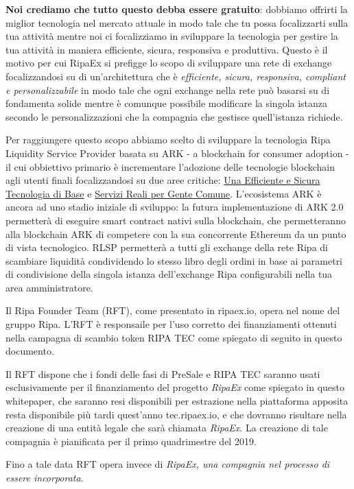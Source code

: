 \textbf{Noi crediamo che tutto questo debba essere gratuito}: dobbiamo offrirti la miglior tecnologia nel mercato attuale in modo tale che tu 
possa focalizzarti sulla tua attività mentre noi ci focalizziamo in sviluppare la tecnologia per gestire la tua attività in maniera efficiente, 
sicura, responsiva e produttiva. Questo è il motivo per cui RipaEx si prefigge lo scopo di sviluppare una rete di exchange
focalizzandosi su di un'architettura che è \textit{efficiente, sicura, responsiva, compliant e personalizzabile} in modo tale che ogni exchange
nella rete può basarsi su di fondamenta solide mentre è comunque possibile modificare la singola istanza secondo le personalizzazioni 
che la compagnia che gestisce quell'istanza richiede.

Per raggiungere questo scopo abbiamo scelto di sviluppare la tecnologia Ripa Liquidity Service Provider basata su ARK - a blockchain for consumer adoption - 
il cui obbiettivo primario è incrementare l'adozione delle tecnologie blockchain agli utenti finali focalizzandosi su due aree critiche: 
\underline{Una Efficiente e Sicura Tecnologia di Base} e \underline{Servizi Reali per Gente Comune}. L'ecosistema ARK è ancora ad uno stadio
iniziale di sviluppo: la futura implementazione di ARK 2.0 permetterà di eseguire smart contract nativi sulla blockchain, che permetteranno
alla blockchain ARK di competere con la sua concorrente Ethereum da un punto di vista tecnologico. RLSP permetterà a tutti gli exchange della rete Ripa
di scambiare liquidità condividendo lo stesso libro degli ordini in base ai parametri di condivisione della singola istanza dell'exchange Ripa
configurabili nella tua area amministratore.

Il Ripa Founder Team (RFT), come presentato in ripaex.io, opera nel nome del gruppo Ripa. L'RFT è responsaile per l'uso corretto dei finanziamenti
ottenuti nella campagna di scambio token RIPA TEC come spiegato di seguito in questo documento.

Il RFT dispone che i fondi delle fasi di PreSale e RIPA TEC saranno usati esclusivamente per il finanziamento del progetto 
\emph{RipaEx} come spiegato in questo whitepaper, che saranno resi disponibili per estrazione nella piattaforma apposita resta disponibile
più tardi quest'anno tec.ripaex.io, e che dovranno risultare nella creazione di una entità legale che sarà chiamata \emph{RipaEx}. La creazione di tale 
compagnia è pianificata per il primo quadrimestre del 2019.

Fino a tale data RFT opera invece di \emph{RipaEx, una compagnia nel processo di essere incorporata}.

